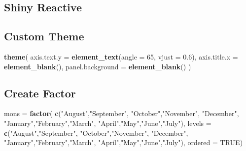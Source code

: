 \documentclass[]{book}
\newenvironment{Shaded}{\begin{snugshade}}{\end{snugshade}}
\newcommand{\KeywordTok}[1]{\textcolor[rgb]{0.13,0.29,0.53}{\textbf{#1}}}
\newcommand{\DataTypeTok}[1]{\textcolor[rgb]{0.13,0.29,0.53}{#1}}
\newcommand{\DecValTok}[1]{\textcolor[rgb]{0.00,0.00,0.81}{#1}}
\newcommand{\FloatTok}[1]{\textcolor[rgb]{0.00,0.00,0.81}{#1}}
\newcommand{\StringTok}[1]{\textcolor[rgb]{0.31,0.60,0.02}{#1}}
\newcommand{\OtherTok}[1]{\textcolor[rgb]{0.56,0.35,0.01}{#1}}
\newcommand{\OperatorTok}[1]{\textcolor[rgb]{0.81,0.36,0.00}{\textbf{#1}}}
\newcommand{\NormalTok}[1]{#1}
\theoremstyle{definition}
\theoremstyle{definition}
\theoremstyle{definition}
\theoremstyle{remark}
\begin{document}
\subsection{Shiny Reactive}\label{shiny-reactive}

\begin{Shaded}
\end{Shaded}

\subsection{Custom Theme}\label{custom-theme}

\begin{Shaded}
\begin{Highlighting}[]
\KeywordTok{theme}\NormalTok{(}
     \DataTypeTok{axis.text.y =} \KeywordTok{element_text}\NormalTok{(}\DataTypeTok{angle =} \DecValTok{65}\NormalTok{, }\DataTypeTok{vjust =} \FloatTok{0.6}\NormalTok{),}
     \DataTypeTok{axis.title.x =} \KeywordTok{element_blank}\NormalTok{(),}
     \DataTypeTok{panel.background =} \KeywordTok{element_blank}\NormalTok{()}
\NormalTok{     )}
\end{Highlighting}
\end{Shaded}

\subsection{Create Factor}\label{create-factor}

\begin{Shaded}
\begin{Highlighting}[]
\NormalTok{mons =}\StringTok{ }\KeywordTok{factor}\NormalTok{(}
   \KeywordTok{c}\NormalTok{(}\StringTok{"August"}\NormalTok{,}\StringTok{"September"}\NormalTok{, }\StringTok{"October"}\NormalTok{,}\StringTok{"November"}\NormalTok{,}
           \StringTok{"December"}\NormalTok{, }\StringTok{"January"}\NormalTok{,}\StringTok{"February"}\NormalTok{,}\StringTok{"March"}\NormalTok{,}
               \StringTok{"April"}\NormalTok{,}\StringTok{"May"}\NormalTok{,}\StringTok{"June"}\NormalTok{,}\StringTok{"July"}\NormalTok{),}
  \DataTypeTok{levels =} \KeywordTok{c}\NormalTok{(}\StringTok{"August"}\NormalTok{,}\StringTok{"September"}\NormalTok{, }\StringTok{"October"}\NormalTok{,}\StringTok{"November"}\NormalTok{,}
           \StringTok{"December"}\NormalTok{, }\StringTok{"January"}\NormalTok{,}\StringTok{"February"}\NormalTok{,}\StringTok{"March"}\NormalTok{,}
               \StringTok{"April"}\NormalTok{,}\StringTok{"May"}\NormalTok{,}\StringTok{"June"}\NormalTok{,}\StringTok{"July"}\NormalTok{),}
  \DataTypeTok{ordered =} \OtherTok{TRUE}\NormalTok{)}
\end{Highlighting}
\end{Shaded}
\end{document}
